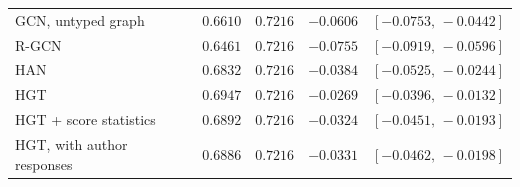 \begin{table}[t]
\begin{tabular}{@{}lrrrr@{}}
GCN, untyped graph & $0.6610$ & $0.7216$ & $-0.0606$ & $[-0.0753,\,-0.0442]$ \\
R-GCN & $0.6461$ & $0.7216$ & $-0.0755$ & $[-0.0919,\,-0.0596]$ \\
HAN & $0.6832$ & $0.7216$ & $-0.0384$ & $[-0.0525,\,-0.0244]$ \\
HGT & $0.6947$ & $0.7216$ & $-0.0269$ & $[-0.0396,\,-0.0132]$ \\
HGT + score statistics & $0.6892$ & $0.7216$ & $-0.0324$ & $[-0.0451,\,-0.0193]$ \\
HGT, with author responses & $0.6886$ & $0.7216$ & $-0.0331$ & $[-0.0462,\,-0.0198]$ \\
\bottomrule
\end{tabular}
\end{table}
